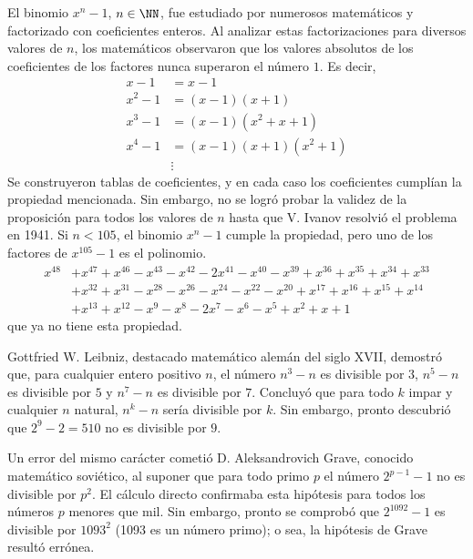 \begin{examplebox}{}{}
    El binomio $x^n - 1$, $n \in \NN$, fue estudiado por numerosos matemáticos y factorizado con coeficientes enteros. Al analizar estas factorizaciones para diversos valores de $n$, los matemáticos observaron que los valores absolutos de los coeficientes de los factores nunca superaron el número $1$. Es decir,
    \begin{align*}
        x-1 &=x-1 \\
        x^2-1 &=(x-1)(x+1) \\
        x^3-1 &=(x-1)\left( x^2+x+1 \right) \\
        x^4-1 &=(x-1)(x+1)\left(x^2+1\right) \\
        &\vdots 
    \end{align*}
    Se construyeron tablas de coeficientes, y en cada caso los coeficientes cumplían la propiedad mencionada. Sin embargo, no se logró probar la validez de la proposición para todos los valores de $n$ hasta que V. Ivanov resolvió el problema en 1941. Si $n < 105$, el binomio $x^n - 1$ cumple la propiedad, pero uno de los factores de $x^{105} - 1$ es el polinomio.
    \begin{align*}
        x^{48} & +x^{47}+x^{46}-x^{43}-x^{42}-2x^{41}-x^{40}-x^{39}+x^{36}+x^{35}+x^{34}+x^{33} \\
        &+x^{32}+x^{31}-x^{28}-x^{26}-x^{24}-x^{22}-x^{20}+x^{17}+x^{16}+x^{15}+x^{14} \\
        &+x^{13}+x^{12}-x^9-x^8-2x^7-x^6-x^5+x^2+x+1
    \end{align*}
    que ya no tiene esta propiedad.
\end{examplebox}

\begin{examplebox}{}{}
    Gottfried W. Leibniz, destacado matemático alemán del siglo XVII, demostró que, para cualquier entero positivo $n$, el número $n^3 - n$ es divisible por $3$, $n^5 - n$ es divisible por $5$ y $n^7 - n$ es divisible por $7$. Concluyó que para todo $k$ impar y cualquier $n$ natural, $n^k - n$ sería divisible por $k$. Sin embargo, pronto descubrió que $2^9 - 2 = 510$ no es divisible por $9$.
\end{examplebox}

\begin{examplebox}{}{}
    Un error del mismo carácter cometió D. Aleksandrovich Grave, conocido matemático soviético, al suponer que para todo primo $p$ el número $2^{p-1} - 1$ no es divisible por $p^2$. El cálculo directo confirmaba esta hipótesis para todos los números $p$ menores que mil. Sin embargo, pronto se comprobó que $2^{1092} - 1$ es divisible por $1093^2$ (1093 es un número primo); o sea, la hipótesis de Grave resultó errónea.
\end{examplebox}

